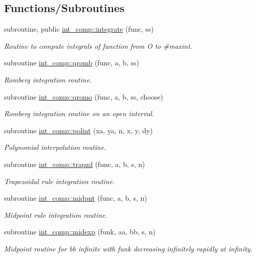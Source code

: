 \subsection*{Functions/\+Subroutines}
\begin{DoxyCompactItemize}
\item 
subroutine, public \hyperlink{namespaceint__comp_abe29ceac2104e45aafacb9cfaed81678}{int\+\_\+comp\+::integrate} (func, ss)
\begin{DoxyCompactList}\small\item\em Routine to compute integrals of function from O to \#maxint. \end{DoxyCompactList}\item 
subroutine \hyperlink{namespaceint__comp_ac2e03ae287d3d4d6f2200ec47811934f}{int\+\_\+comp\+::qromb} (func, a, b, ss)
\begin{DoxyCompactList}\small\item\em Romberg integration routine. \end{DoxyCompactList}\item 
subroutine \hyperlink{namespaceint__comp_a168d531430c3bc8b148e2fed9e737cb7}{int\+\_\+comp\+::qromo} (func, a, b, ss, choose)
\begin{DoxyCompactList}\small\item\em Romberg integration routine on an open interval. \end{DoxyCompactList}\item 
subroutine \hyperlink{namespaceint__comp_a0124c395371f5bfddb47dd0bd6cd7546}{int\+\_\+comp\+::polint} (xa, ya, n, x, y, dy)
\begin{DoxyCompactList}\small\item\em Polynomial interpolation routine. \end{DoxyCompactList}\item 
subroutine \hyperlink{namespaceint__comp_a28bf085971c103555a3af11940180299}{int\+\_\+comp\+::trapzd} (func, a, b, s, n)
\begin{DoxyCompactList}\small\item\em Trapezoidal rule integration routine. \end{DoxyCompactList}\item 
subroutine \hyperlink{namespaceint__comp_a95eecb9c6f6cec6d1fc9e7d4db234d35}{int\+\_\+comp\+::midpnt} (func, a, b, s, n)
\begin{DoxyCompactList}\small\item\em Midpoint rule integration routine. \end{DoxyCompactList}\item 
subroutine \hyperlink{namespaceint__comp_ace705445517d423d3b66748b94a5dc0b}{int\+\_\+comp\+::midexp} (funk, aa, bb, s, n)
\begin{DoxyCompactList}\small\item\em Midpoint routine for bb infinite with funk decreasing infinitely rapidly at infinity. \end{DoxyCompactList}\end{DoxyCompactItemize}
